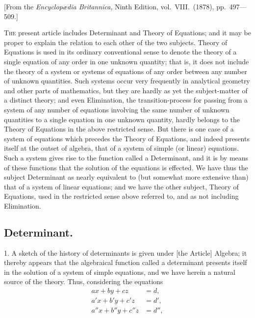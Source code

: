 \documentclass[12pt,a4paper,oneside]{book}
\begin{document}
\begin{center}
\small [From the \textit{Encyclop\ae dia Britannica}, Ninth Edition, vol.~VIII.\ (1878), pp.~497---509.]
\end{center}

\medskip

\textsc{The} present article includes Determinant and Theory of Equations; and it may be proper to explain the relation to each other of the two subjects. Theory of Equations is used in its ordinary conventional sense to denote the theory of a single equation of any order in one unknown quantity; that is, it does not include the theory of a system or systems of equations of any order between any number of unknown quantities. Such systems occur very frequently in analytical geometry and other parts of mathematics, but they are hardly as yet the subject-matter of a distinct theory; and even Elimination, the transition-process for passing from a system of any number of equations involving the same number of unknown quantities to a single equation in one unknown quantity, hardly belongs to the Theory of Equations in the above restricted sense. But there is one case of a system of equations which precedes the Theory of Equations, and indeed presents itself at the outset of algebra, that of a system of simple (or linear) equations. Such a system gives rise to the function called a Determinant, and it is by means of these functions that the solution of the equations is effected. We have thus the subject Determinant as nearly equivalent to (but somewhat more extensive than) that of a system of linear equations; and we have the other subject, Theory of Equations, used in the restricted sense above referred to, and as not including Elimination.

\subsection*{Determinant.}

1. A sketch of the history of determinants is given under [the Article] Algebra; it thereby appears that the algebraical function called a determinant presents itself in the solution of a system of simple equations, and we have herein a natural source of the theory. Thus, considering the equations
\begin{align*}
ax + by + cz &= d,\\
a'x + b'y + c'z &= d',\\
a''x + b''y + c''z &= d'',
\end{align*}
\end{document}

